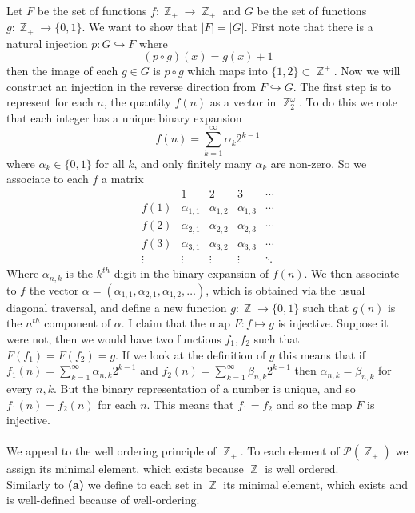 \documentclass{article}
\DeclareMathOperator{\Z}{\mathbb{Z}}
\DeclareMathOperator{\into}{\hookrightarrow}
\newcommand{\problem}[1]{\noindent{\textbf{Problem #1}}\\}
\newcommand{\problempart}[1]{\noindent{\textbf{(#1)}}}
\begin{document}
\problem{1.7.7} Let $F$ be the set of functions $f: \Z_+ \to \Z_+$ and $G$ be the set of functions $g: \Z_+ \to \{0,1\}$. We want to show that $|F| = |G|$. First note that there is a natural injection $p: G \into F$ where 
\[
(p\circ g)(x) = g(x) + 1
\]
then the image of each $g \in G$ is $p\circ g$ which maps into $\{1,2\} \subset \Z^+$. Now we will construct an injection in the reverse direction from $F \into G$. The first step is to represent for each $n$, the quantity $f(n)$ as a vector in $\Z_2^\omega$. To do this we note that each integer has a unique binary expansion
\[
f(n) = \sum_{k=1}^\infty \alpha_k2^{k-1}
\]
where $\alpha_k \in \{0,1\}$ for all $k$, and only finitely many $\alpha_k$ are non-zero. So we associate to each $f$ a matrix 
\[
\begin{array}{c|cccc}
    & 1 & 2 & 3 & \cdots \\
  \hline
  f(1) & \alpha_{1,1} & \alpha_{1,2} & \alpha_{1,3} & \cdots \\
  f(2) & \alpha_{2,1} & \alpha_{2,2} & \alpha_{2,3} & \cdots \\
  f(3) & \alpha_{3,1} & \alpha_{3,2} & \alpha_{3,3} & \cdots \\
  \vdots & \vdots & \vdots & \vdots & \ddots
 \end{array}
\]
Where $\alpha_{n,k}$ is the $k^{th}$ digit in the binary expansion of $f(n)$. We then associate to $f$ the vector $\alpha = (\alpha_{1,1}, \alpha_{2,1}, \alpha_{1,2}, \ldots)$, which is obtained via the usual diagonal traversal, and define a new function $g: \Z \to \{0,1\}$ such that $g(n)$ is the $n^{th}$ component of  $\alpha$. I claim that the map $F: f \mapsto g$ is injective. Suppose it were not, then we would have two functions $f_1, f_2$ such that $F(f_1) = F(f_2) = g$. If we look at the definition of $g$ this means that if $f_1(n) = \sum_{k=1}^\infty \alpha_{n,k}2^{k-1}$ and $f_2(n) = \sum_{k=1}^\infty \beta_{n,k}2^{k-1}$ then $\alpha_{n,k} = \beta_{n,k}$ for every $n,k$. But the binary representation of a number is unique, and so $f_1(n) = f_2(n)$ for each $n$. This means that $f_1 = f_2$ and so the map $F$ is injective. \\
\problem{1.9.2}
\problempart{a} We appeal to the well ordering principle of $\Z_+$. To each element of $\mathcal{P}(\Z_+)$ we assign its minimal element, which exists because $\Z$ is well ordered.\\
\problempart{b} Similarly to {\bf (a)} we define to each set in $\Z$ its minimal element, which exists and is well-defined because of well-ordering. \\
\end{document}
